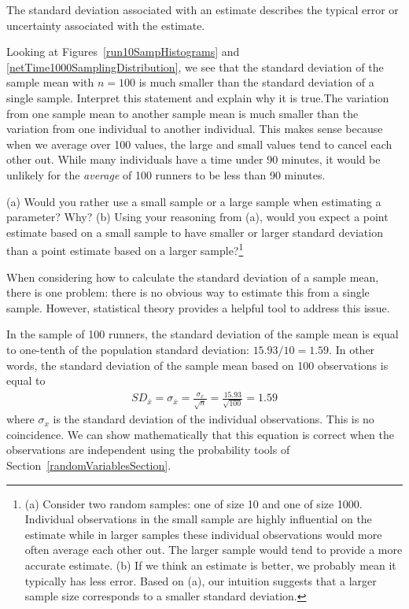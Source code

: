 \begin{termBox}{
The standard deviation associated with an estimate describes the typical error or uncertainty associated with the estimate.}
\end{termBox}

\begin{example}{Looking at Figures~\ref{run10SampHistograms} and \ref{netTime1000SamplingDistribution}, we see that the standard deviation of the sample mean with $n=100$ is much smaller than the standard deviation of a single sample. Interpret this statement and explain why it is true.}The variation from one sample mean to another sample mean is much smaller than the variation from one individual to another individual. This makes sense because when we average over 100 values, the large and small values tend to cancel each other out. While many individuals have a time under 90 minutes, it would be unlikely for the \emph{average} of 100 runners to be less than 90 minutes.
\end{example}

\textA{\pagebreak}

\begin{exercise}
(a) Would you rather use a small sample or a large sample when estimating a parameter? Why? (b) Using your reasoning from (a), would you expect a point estimate based on a small sample to have smaller or larger standard deviation than a point estimate based on a larger sample?\footnote{(a) Consider two random samples: one of size 10 and one of size 1000. Individual observations in the small sample are highly influential on the estimate while in larger samples these individual observations would more often average each other out. The larger sample would tend to provide a more accurate estimate. (b) If we think an estimate is better, we probably mean it typically has less error. Based on (a), our intuition suggests that a larger sample size corresponds to a smaller standard deviation.}
\end{exercise}

When considering how to calculate the standard deviation of a sample mean, there is one problem: there is no obvious way to estimate this from a single sample. However, statistical theory provides a helpful tool to address this issue.

In the sample of 100 runners, the standard deviation of the sample mean is equal to one-tenth of the population standard deviation: $15.93/10 = 1.59$. In other words, the standard deviation of the sample mean based on 100 observations is equal to
\begin{eqnarray*}
SD_{\bar{x}} = \sigma_{\bar{x}} = \frac{\sigma_{x}}{\sqrt{n}} = \frac{15.93}{\sqrt{100}} = 1.59
\end{eqnarray*}
where $\sigma_{x}$ is the standard deviation of the individual observations. This is no coincidence. We can show mathematically that this equation is correct when the observations are independent  using the probability tools of Section~\ref{randomVariablesSection}.


